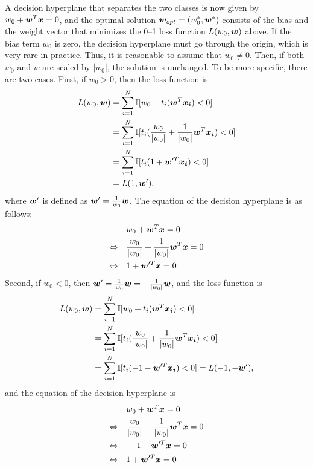 A decision hyperplane that separates the two classes is now given by $w_0 + \boldsymbol{w}^T\boldsymbol{x} = 0$, and the optimal solution $\boldsymbol{w}_{opt} = (w_0^*, \boldsymbol{w}^*)$ consists of the bias and the weight vector that minimizes the 0--1 loss function $L(w_0, \boldsymbol{w})$ above. If the bias term $w_0$ is zero, the decision hyperplane must go through the origin, which is very rare in practice. Thus, it is reasonable to assume that $w_0 \not= 0$. Then, if both $w_0$ and $w$ are scaled by $|w_0|$, the solution is unchanged. To be more specific, there are two cases. First, if $w_0>0$, then the loss function is:
\[ \begin{split}
L(w_0,\boldsymbol{w}) &= \sum_{i=1}^N \mathbb{I} [w_0 + t_i (\boldsymbol{w}^T \boldsymbol{x_i}) < 0] \\
&=\sum_{i=1}^N \mathbb{I} [t_i (\frac{w_0}{|w_0|} + \frac{1}{|w_0|}\boldsymbol{w}^T \boldsymbol{x_i}) < 0]  \\
&= \sum_{i=1}^N \mathbb{I} [t_i (1 + \boldsymbol{w}'^T \boldsymbol{x_i}) < 0] \\
&= L(1, \boldsymbol{w}'),\\
\end{split} \]
where $\boldsymbol{w}'$ is defined as $\boldsymbol{w}' = \frac{1}{w_0}\boldsymbol{w}$. The equation of the decision hyperplane is as follows:
\[ \begin{split} 
&w_0 + \boldsymbol{w}^T\boldsymbol{x} = 0 \\
\Leftrightarrow \quad
&\frac{w_0}{|w_0|} + \frac{1}{|w_0|} \boldsymbol{w}^T \boldsymbol{x}  = 0 \\ \Leftrightarrow \quad
&1 + \boldsymbol{w}'^T \boldsymbol{x} = 0
\end{split} \]
Second, if $w_0 < 0$, then $\boldsymbol{w}' = \frac{1}{w_0}\boldsymbol{w} = -\frac{1}{|w_0|}\boldsymbol{w}$, and the loss function is 
\[ \begin{split}
L(w_0,\boldsymbol{w}) &= \sum_{i=1}^N \mathbb{I} [w_0 + t_i (\boldsymbol{w}^T \boldsymbol{x_i}) < 0] \\
&=\sum_{i=1}^N \mathbb{I} [t_i (\frac{w_0}{|w_0|} + \frac{1}{|w_0|}\boldsymbol{w}^T \boldsymbol{x_i}) < 0]  \\
&= \sum_{i=1}^N \mathbb{I} [t_i (-1 - \boldsymbol{w}'^T \boldsymbol{x_i}) < 0] 
= L(-1, -\boldsymbol{w}'),\\
\end{split} \]
and the equation of the decision hyperplane is 
\[ \begin{split} 
&w_0 + \boldsymbol{w}^T\boldsymbol{x} = 0 \\
\Leftrightarrow \quad
&\frac{w_0}{|w_0|} + \frac{1}{|w_0|} \boldsymbol{w}^T \boldsymbol{x}  = 0 \\ \Leftrightarrow \quad
&-1 - \boldsymbol{w}'^T \boldsymbol{x} = 0 \\
\Leftrightarrow \quad
&1 + \boldsymbol{w}'^T \boldsymbol{x} = 0
\end{split} \]
